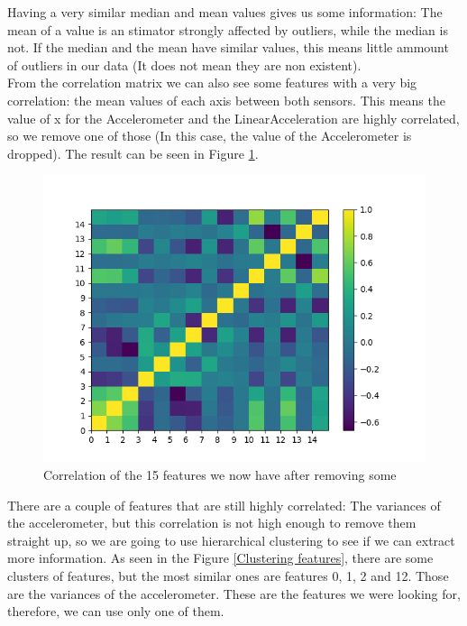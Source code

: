 \documentclass[idxtotoc,hyperref,openany]{labbook} %
\begin{document}
Having a very similar median and mean values gives us some information: The mean of a value is an stimator strongly affected by outliers, while the median is not. If the median and the mean have similar values, this means little ammount of outliers in our data (It does not mean they are non existent).\\

From the correlation matrix we can also see some features with a very big correlation: the mean values of each axis between both sensors. This means the value of x for the Accelerometer and the LinearAcceleration are highly correlated, so we remove one of those (In this case, the value of the Accelerometer is dropped). The result can be seen in Figure \ref{Correlation postdrop}.

\begin{figure}[h]
\includegraphics[width=0.9\linewidth]{Features_CorrelationMatrix_postDrop_Day1.png}
\setlength\belowcaptionskip{-10pt}
\caption{Correlation of the 15 features we now have after removing some}
\label{Correlation postdrop}
\end{figure}


There are a couple of features that are still highly correlated: The variances of the accelerometer, but this correlation is not high enough to remove them straight up, so we are going to use hierarchical clustering to see if we can extract more information. As seen in the Figure \ref{Clustering features}, there are some clusters of features, but the most similar ones are features 0, 1, 2 and 12. Those are the variances of the accelerometer. These are the features we were looking for, therefore, we can use only one of them.
\end{document}
